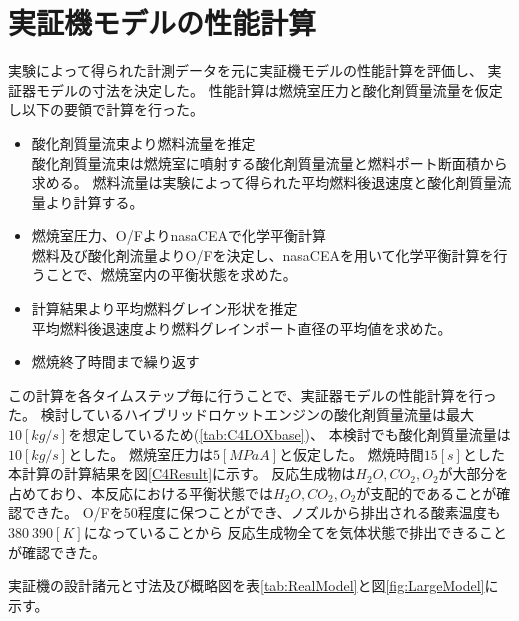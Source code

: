 \section{実証機モデルの性能計算}
実験によって得られた計測データを元に実証機モデルの性能計算を評価し、
実証器モデルの寸法を決定した。
性能計算は燃焼室圧力と酸化剤質量流量を仮定し以下の要領で計算を行った。
\begin{itemize}
\item 酸化剤質量流束より燃料流量を推定\\
酸化剤質量流束は燃焼室に噴射する酸化剤質量流量と燃料ポート断面積から求める。
燃料流量は実験によって得られた平均燃料後退速度と酸化剤質量流量より計算する。
\item 燃焼室圧力、O/FよりnasaCEAで化学平衡計算\\
燃料及び酸化剤流量よりO/Fを決定し、nasaCEAを用いて化学平衡計算を行うことで、燃焼室内の平衡状態を求めた。
\item 計算結果より平均燃料グレイン形状を推定\\
平均燃料後退速度より燃料グレインポート直径の平均値を求めた。
\item 燃焼終了時間まで繰り返す
\end{itemize}
この計算を各タイムステップ毎に行うことで、実証器モデルの性能計算を行った。
検討しているハイブリッドロケットエンジンの酸化剤質量流量は最大$10[kg/s]$を想定しているため(\ref{tab:C4LOXbase})、
本検討でも酸化剤質量流量は$10[kg/s]$とした。
燃焼室圧力は$5[MPaA]$と仮定した。
燃焼時間$15[s]$とした本計算の計算結果を図\ref{C4Result}に示す。
反応生成物は$H_2O,CO_2,O_2$が大部分を占めており、本反応における平衡状態では$H_2O,CO_2,O_2$が支配的であることが確認できた。
O/Fを50程度に保つことができ、ノズルから排出される酸素温度も$380~390[K]$になっていることから
反応生成物全てを気体状態で排出できることが確認できた。

実証機の設計諸元と寸法及び概略図を表\ref{tab:RealModel}と図\ref{fig:LargeModel}に示す。
